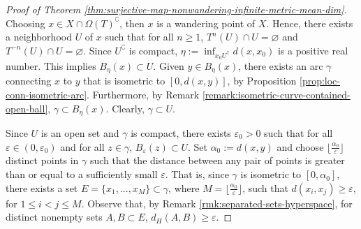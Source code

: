 \documentclass[sn-mathphys-num]{sn-jnl}%
\theoremstyle{thmstyleone}%
\theoremstyle{thmstyletwo}%
\theoremstyle{thmstylethree}%
\begin{document}
\begin{proof}[Proof of Theorem \emph{\ref{thm:surjective-map-nonwandering-infinite-metric-mean-dim}}]
    Choosing $x \in X\cap\Omega(T)^\complement$, then $x$ is a wandering point of $X$. Hence, there exists a neighborhood $U$ of $x$ such that for all $n \geq 1$, $T^n(U) \cap U = \varnothing$ and $T^{-n}(U) \cap U = \varnothing$. Since $U^\complement$ is compact, $\eta := \inf_{x_0 U^\complement} d(x, x_0)$ is a positive real number. This implies $B_\eta(x) \subset U$. Given $y \in B_\eta(x)$, there exists an arc $\gamma$ connecting $x$ to $y$ that is isometric to $[0, d(x, y)]$, by Proposition \ref{prop:loc-conn-isometric-arc}. Furthermore, by Remark \ref{remark:isometric-curve-contained-open-ball}, $\gamma \subset B_\eta(x)$. Clearly, $\gamma \subset U$. 
    
    Since $U$ is an open set and $\gamma$ is compact, there exists $\varepsilon_0 > 0$ such that for all $\varepsilon \in (0, \varepsilon_0)$ and for all $z \in \gamma$, $B_\varepsilon(z) \subset U$. Set $\alpha_0 := d(x, y)$ and choose $\lfloor \frac{\alpha_0}{\varepsilon} \rfloor$ distinct points in $\gamma$ such that the distance between any pair of points is greater than or equal to a sufficiently small $\varepsilon$. That is, since $\gamma$ is isometric to $[0, \alpha_0]$, there exists a set $E = \{x_1, ..., x_M\} \subset \gamma$, where $M = \lfloor \frac{\alpha_0}{\varepsilon} \rfloor$, such that $d(x_i, x_j) \geq \varepsilon$, for $1 \leq i < j \leq M$. Observe that, by Remark \ref{rmk:separated-sets-hyperspace}, for distinct nonempty sets $A, B \subset E$, $d_H(A, B) \geq \varepsilon$. 


\end{proof}
\end{document}
